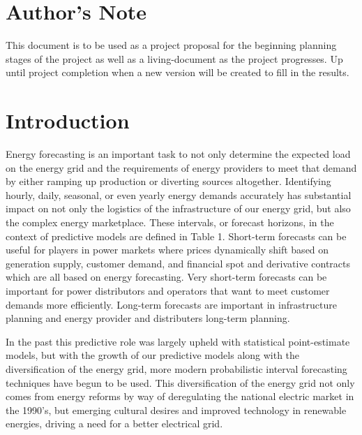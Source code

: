 \documentclass[sigconf]{acmart}
\begin{document}
\maketitle

\section{Author's Note}
This document is to be used as a project proposal for the beginning planning stages of the project as well as a living-document as the project progresses. Up until project completion when a new version will be created to fill in the results.

\section{Introduction}
Energy forecasting is an important task to not only determine the expected load on the energy grid and the requirements of energy providers to meet that demand by either ramping up production or diverting sources altogether.\cite{Hong16} Identifying hourly, daily, seasonal, or even yearly energy demands accurately has substantial impact on not only the logistics of the infrastructure of our energy grid, but also the complex energy marketplace. These intervals, or forecast horizons, in the context of predictive models are defined in Table 1. Short-term forecasts can be useful for players in power markets where prices dynamically shift based on generation supply, customer demand, and financial spot and derivative contracts which are all based on energy forecasting.\cite{Bunn04} Very short-term forecasts can be important for power distributors and operators that want to meet customer demands more efficiently. Long-term forecasts are important in infrastructure planning and energy provider and distributers long-term planning. 

In the past this predictive role was largely upheld with statistical point-estimate models, but with the growth of our predictive models along with the diversification of the energy grid, more modern probabilistic interval forecasting techniques have begun to be used.\cite{Lee21, Weron14, Hong16} This diversification of the energy grid not only comes from energy reforms by way of deregulating the national electric market in the 1990's, but emerging cultural desires and improved technology in renewable energies, driving a need for a better electrical grid.\cite{Joskow01}
\end{document}
